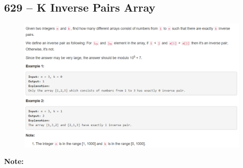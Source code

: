 \documentclass[a4paper,12pt]{article}
\begin{document}
\subsection{629 -- K Inverse Pairs Array}
\begin{figure}[H]
	\begin{center}
		\includegraphics[width=18cm]{629.png}
	\end{center}
\end{figure}
\textbf{\large{Note:}}
\par
\vspace{0.5em}
\noindent
\end{document}
